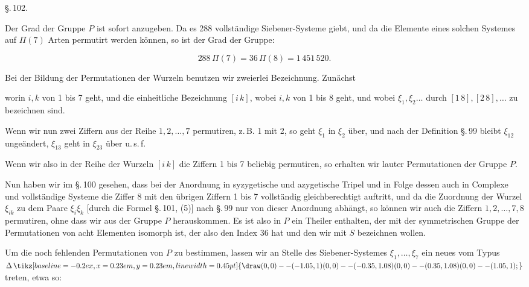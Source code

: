 \providecommand{\weberfourup}{\mathord{\tikz[baseline=-0.2ex,x=0.23em,y=0.23em,line width=0.45pt]{\draw (0,0)--(-1.05,1) (0,0)--(-0.35,1.08) (0,0)--(0.35,1.08) (0,0)--(1.05,1);}}}
\begin{center}
\S.\,102.

\end{center}

Der Grad der Gruppe $P$ ist sofort anzugeben. Da es 288 vollständige Siebener-Systeme giebt, und da die Elemente eines solchen Systemes auf $\Pi(7)$ Arten permutirt werden können, so ist der Grad der Gruppe:

\[
288\,\Pi(7) = 36\,\Pi(8) = 1\,451\,520.
\]

Bei der Bildung der Permutationen der Wurzeln benutzen wir zweierlei Bezeichnung. Zunächst


worin $i,k$ von 1 bis 7 geht, und die einheitliche Bezeichnung $[i\,k]$, wobei $i,k$ von 1 bis 8 geht, und wobei $\xi_1,\xi_2\dots$ durch $[1\,8],[2\,8],\dots$ zu bezeichnen sind.

Wenn wir nun zwei Ziffern aus der Reihe $1,2,\dots,7$ permutiren, z.\,B. 1 mit 2, so geht $\xi_1$ in $\xi_2$ über, und nach der Definition \S.\,99 bleibt $\xi_{12}$ ungeändert, $\xi_{13}$ geht in $\xi_{23}$ über u.\,s.\,f.

Wenn wir also in der Reihe der Wurzeln $[i\,k]$ die Ziffern 1 bis 7 beliebig permutiren, so erhalten wir lauter Permutationen der Gruppe $P$.

Nun haben wir im \S.\,100 gesehen, dass bei der Anordnung in syzygetische und azygetische Tripel und in Folge dessen auch in Complexe und vollständige Systeme die Ziffer 8 mit den übrigen Ziffern 1 bis 7 vollständig gleichberechtigt auftritt, und da die Zuordnung der Wurzel $\xi_{ik}$ zu dem Paare $\xi_i\xi_k$ [durch die Formel \S.\,101, (5)] nach \S.\,99 nur von dieser Anordnung abhängt, so können wir auch die Ziffern $1,2,\dots,7,8$ permutiren, ohne dass wir aus der Gruppe $P$ herauskommen. Es ist also in $P$ ein Theiler enthalten, der mit der symmetrischen Gruppe der Permutationen von acht Elementen isomorph ist, der also den Index 36 hat und den wir mit $S$ bezeichnen wollen.

Um die noch fehlenden Permutationen von $P$ zu bestimmen, lassen wir an Stelle des Siebener-Systemes $\xi_1,\dots,\xi_7$ ein neues vom Typus $\Delta\,\weberfourup$ treten, etwa so:


